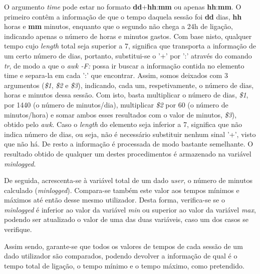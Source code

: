 \documentclass[10pt,portuguese]{article}
\begin{document}
\par O argumento \textit{time} pode estar no formato \textbf{dd}+\textbf{hh}:\textbf{mm} ou apenas \textbf{hh}:\textbf{mm}. O primeiro contêm a informação de que o tempo daquela sessão foi \textbf{dd} dias, \textbf{hh} horas e \textbf{mm} minutos, enquanto que o segundo não chega a 24h de ligação, indicando apenas o número de horas e minutos gastos. Com base nisto, qualquer tempo cujo \textit{length} total seja superior a 7, significa que transporta a informação de um certo número de dias, portanto, substitui-se o '+' por ':' através do comando \textit{tr}, de modo a que o \textit{awk -F:} possa ir buscar a informação contida no elemento time e separa-la em cada ':' que encontrar. Assim, somos deixados com 3 argumentos (\textit{\$1}, \textit{\$2} e \textit{\$3}), indicando, cada um, respetivamente, o número de dias, horas e minutos dessa sessão. Com isto, basta multiplicar o número de dias, \textit{\$1}, por 1440 (o número de minutos/dia), multiplicar \textit{\$2} por 60 (o número de minutos/hora) e somar ambos esses resultados com o valor de minutos, \textit{\$3}), obtido pelo \textit{awk}. Caso o \textit{length} do elemento seja inferior a 7, significa que não indica número de dias, ou seja, não é necessário substituir nenhum sinal '+', visto que não há. De resto a informação é processada de modo bastante semelhante. O resultado obtido de qualquer um destes procedimentos é armazenado na variável \textit{minlogged}. 
\par De seguida, acrescenta-se à variável total de um dado \textit{user}, o número de minutos calculado (\textit{minlogged}). Compara-se também este valor aos tempos mínimos e máximos até então desse mesmo utilizador. Desta forma, verifica-se se o \textit{minlogged} é inferior ao valor da variável \textit{min} ou superior ao valor da variável \textit{max}, podendo ser atualizado o valor de uma das duas variáveis, caso um dos casos se verifique.
\par Assim sendo, garante-se que todos os valores de tempos de cada sessão de um dado utilizador são comparados, podendo devolver a informação de qual é o tempo total de ligação, o tempo mínimo e o tempo máximo, como pretendido.
\clearpage
\end{document}
